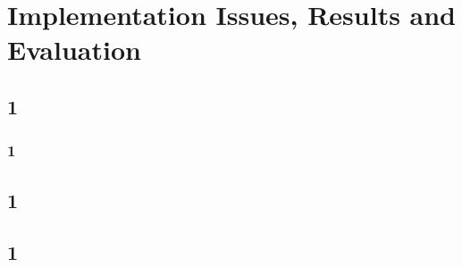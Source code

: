 
\chapter{Implementation Issues, Results and Evaluation} %

\label{Chapter7} %

\section{1}

\par 

\subsection{1}

\par 

\section{1}

\par 

\section{1}

\par 

